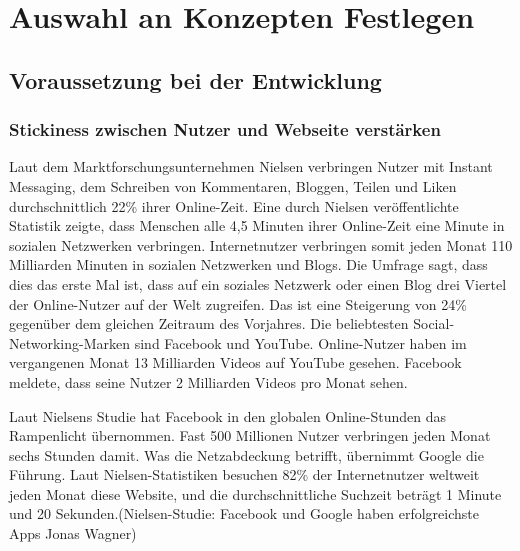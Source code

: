 
\chapter{Auswahl an Konzepten Festlegen}


\section{Voraussetzung bei der Entwicklung}


\subsection{Stickiness zwischen Nutzer und Webseite verstärken}


Laut dem Marktforschungsunternehmen Nielsen verbringen Nutzer mit Instant Messaging, dem Schreiben von Kommentaren, Bloggen, Teilen und \glqq{}Liken\grqq{} durchschnittlich 22\% ihrer Online-Zeit. Eine durch Nielsen veröffentlichte Statistik zeigte, dass Menschen alle 4,5 Minuten ihrer Online-Zeit eine Minute in sozialen Netzwerken verbringen. Internetnutzer verbringen somit jeden Monat 110 Milliarden Minuten in sozialen Netzwerken und Blogs. Die Umfrage sagt, dass dies das erste Mal ist, dass auf ein soziales Netzwerk oder einen Blog \glqq{}drei Viertel der Online-Nutzer auf der Welt zugreifen.\grqq{} Das ist eine Steigerung von 24\% gegenüber dem gleichen Zeitraum des Vorjahres. Die beliebtesten Social-Networking-Marken sind Facebook und YouTube. Online-Nutzer haben im vergangenen Monat 13 Milliarden Videos auf YouTube gesehen. Facebook meldete, dass seine Nutzer 2 Milliarden Videos pro Monat sehen.


Laut Nielsens Studie hat Facebook in den globalen Online-Stunden das Rampenlicht übernommen. Fast 500 Millionen Nutzer verbringen jeden Monat sechs Stunden damit.
Was die Netzabdeckung betrifft, übernimmt Google die Führung. Laut Nielsen-Statistiken besuchen 82\% der Internetnutzer weltweit jeden Monat diese Website, und die durchschnittliche Suchzeit beträgt 1 Minute und 20 Sekunden.(Nielsen-Studie: Facebook und Google haben erfolgreichste Apps Jonas Wagner)

